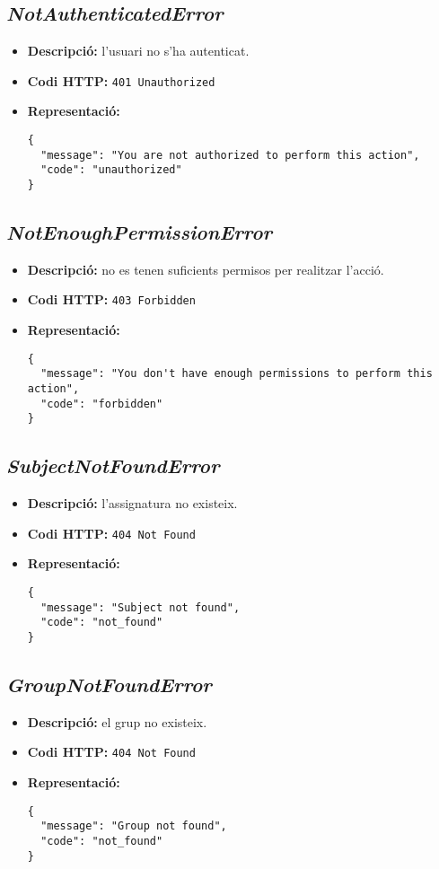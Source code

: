 \subsection{\emph{NotAuthenticatedError}}
\begin{itemize}
	\item \textbf{Descripció:} l'usuari no s'ha autenticat.
	\item \textbf{Codi \ac{HTTP}:} \texttt{401 Unauthorized}
	\item \textbf{Representació:}
\begin{verbatim}
{
  "message": "You are not authorized to perform this action",
  "code": "unauthorized"
}
\end{verbatim}
\end{itemize}
\subsection{\emph{NotEnoughPermissionError}}
\begin{itemize}
	\item \textbf{Descripció:} no es tenen suficients permisos per realitzar l'acció.
	\item \textbf{Codi \ac{HTTP}:} \texttt{403 Forbidden}
	\item \textbf{Representació:}
\begin{verbatim}
{
  "message": "You don't have enough permissions to perform this action",
  "code": "forbidden"
}
\end{verbatim}
\end{itemize}
\subsection{\emph{SubjectNotFoundError}}
\begin{itemize}
	\item \textbf{Descripció:} l'assignatura no existeix.
	\item \textbf{Codi \ac{HTTP}:} \texttt{404 Not Found}
	\item \textbf{Representació:}
\begin{verbatim}
{
  "message": "Subject not found",
  "code": "not_found"
}
\end{verbatim}
\end{itemize}
\subsection{\emph{GroupNotFoundError}}
\begin{itemize}
	\item \textbf{Descripció:} el grup no existeix.
	\item \textbf{Codi \ac{HTTP}:} \texttt{404 Not Found}
	\item \textbf{Representació:}
\begin{verbatim}
{
  "message": "Group not found",
  "code": "not_found"
}
\end{verbatim}
\end{itemize}
